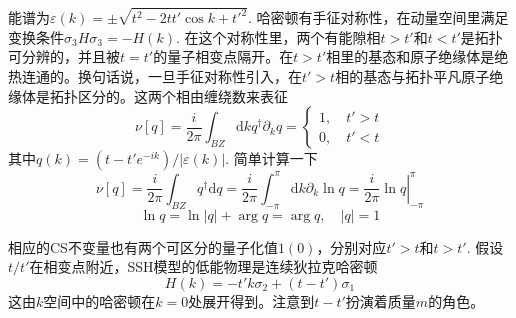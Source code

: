 \documentclass[a4paper]{article}
\numberwithin{equation}{subsection}
\begin{document}
能谱为$\varepsilon(k)=\pm\sqrt{t^2-2tt'\cos k+t'^2}$. 哈密顿有手征对称性，在动量空间里满足变换条件$\sigma_3 H\sigma_3=-H(k)$. 在这个对称性里，两个有能隙相$t>t'$和$t<t'$是拓扑可分辨的，并且被$t=t'$的量子相变点隔开。在$t>t'$相里的基态和原子绝缘体是绝热连通的。换句话说，一旦手征对称性引入，在$t'>t$相的基态与拓扑平凡原子绝缘体是拓扑区分的。这两个相由缠绕数来表征
\begin{equation}
    \nu[q]=\frac{i}{2\pi}\int_{BZ}\mathrm{d}k q^\dagger\partial_k q=\begin{cases}
        1,\quad t'>t\\
        0,\quad t'<t
    \end{cases}
\end{equation}
其中$q(k)=(t-t'e^{-ik})/|\varepsilon(k)|$. 简单计算一下
\begin{equation}
    \nu[q]=\frac{i}{2\pi}\int_{BZ}q^\dagger\mathrm{d}q=\frac{i}{2\pi}\int_{-\pi}^{\pi}\mathrm{d}k\partial_k\ln q=\left.\frac{i}{2\pi}\ln q\right|_{-\pi}^\pi
\end{equation}
\begin{equation}
    \ln q=\ln |q|+\arg q=\arg q,\quad |q|=1
\end{equation}
\begin{center}
\end{center}
相应的CS不变量也有两个可区分的量子化值$1(0)$，分别对应$t'>t$和$t>t'$. 假设$t/t'$在相变点附近，SSH模型的低能物理是连续狄拉克哈密顿
\begin{equation}
    H(k)=-t'k\sigma_2+(t-t')\sigma_1
\end{equation}
这由$k$空间中的哈密顿在$k=0$处展开得到。注意到$t-t'$扮演着质量$m$的角色。
\end{document}
